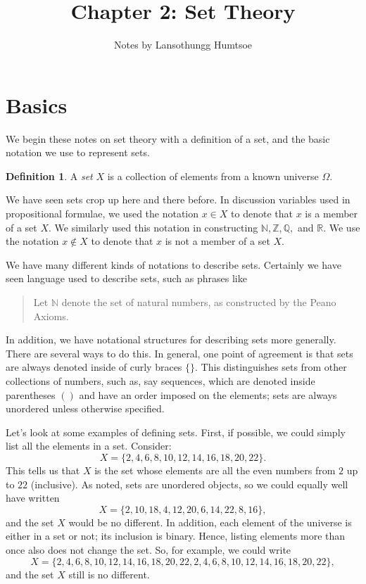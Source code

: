 \documentclass{article}
\theoremstyle{definition}
\newtheorem{definition}{Definition}
\newcommand{\Z}{\mathbb{Z}}
\newcommand{\N}{\mathbb{N}}
\newcommand{\Q}{\mathbb{Q}}
\newcommand{\R}{\mathbb{R}}
\begin{document}
\title{Chapter 2: Set Theory}
\author{Notes by Lansothungg Humtsoe}
\maketitle

\section{Basics}

We begin these notes on set theory with a definition of a set, and the basic notation we use to represent sets.

\begin{definition}
A {\it set} $X$ is a collection of elements from a known universe $\Omega$.
\end{definition}

We have seen sets crop up here and there before. In discussion variables used in propositional formulae, we used the notation $x\in X$ to denote that $x$ is a member of a set $X$. We similarly used this notation in constructing $\N, \Z, \Q,$ and $\R$. We use the notation $x\notin X$ to denote that $x$ is not a member of a set $X$.

We have many different kinds of notations to describe sets. Certainly we have seen language used to describe sets, such as phrases like 
\begin{quote}
Let $\N$ denote the set of natural numbers, as constructed by the Peano Axioms.
\end{quote} In addition, we have notational structures for describing sets more generally. There are several ways to do this. In general, one point of agreement is that sets are always denoted inside of curly braces $\{\}$. This distinguishes sets from other collections of numbers, such as, say sequences, which are denoted inside parentheses $()$ and have an order imposed on the elements; sets are always unordered unless otherwise specified.

Let's look at some examples of defining sets. First, if possible, we could simply list all the elements in a set. Consider:
\[ X = \{2, 4, 6, 8, 10, 12, 14, 16, 18, 20, 22\}.\]
This tells us that $X$ is the set whose elements are all the even numbers from $2$ up to $22$ (inclusive). As noted, sets are unordered objects, so we could equally well have written
\[ X=\{2, 10, 18, 4, 12, 20, 6, 14, 22, 8, 16\},\]
and the set $X$ would be no different. In addition, each element of the universe is either in a set or not; its inclusion is binary. Hence, listing elements more than once also does not change the set. So, for example, we could write
\[ X = \{2, 4, 6, 8, 10, 12, 14, 16, 18, 20, 22, 2, 4, 6, 8, 10, 12, 14, 16, 18, 20, 22\},\]
and the set $X$ still is no different.
\end{document}
